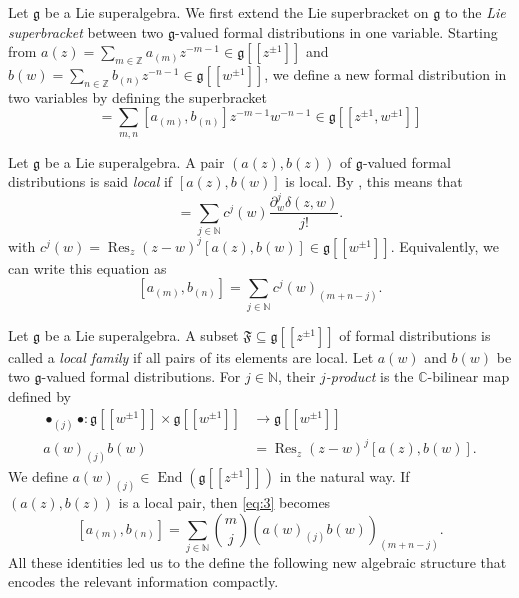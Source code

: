 \documentclass[a4paper, 12pt, reqno]{amsart}
\theoremstyle{remark}
\numberwithin{equation}{subsection}
\DeclareMathOperator{\End}{End}
\DeclareMathOperator{\Res}{Res}
\begin{document}
Let $\mathfrak{g}$ be a Lie superalgebra.
We first extend the Lie superbracket on $\mathfrak{g}$ to the \emph{Lie superbracket} between two $\mathfrak{g}$-valued formal distributions in one variable. Starting from $a(z) = \sum_{m \in \mathbb{Z}}a_{(m)}z^{-m - 1} \in \mathfrak{g}[[z^{\pm 1}]]$ and $b(w) = \sum_{n \in \mathbb{Z}}b_{(n)}z^{-n - 1} \in \mathfrak{g}[[w^{\pm 1}]]$, we define a new formal distribution in two variables by defining the superbracket
\begin{equation*}
  [a(z), b(w)] = \sum_{m, n}[a_{(m)}, b_{(n)}]z^{-m - 1}w^{-n - 1} \in \mathfrak{g}[[z^{\pm 1}, w^{\pm 1}]]
\end{equation*}

Let $\mathfrak{g}$ be a Lie superalgebra.
A pair $(a(z), b(z))$ of $\mathfrak{g}$-valued formal distributions is said \emph{local} if $[a(z), b(w)]$ is local.
By , this means that
\begin{equation*}
  [a(z), b(w)] = \sum_{j \in \mathbb{N}}c^j(w)\frac{\partial^j_w\delta(z, w)}{j!}.
\end{equation*}
with $c^j(w) = \Res_z(z - w)^j[a(z), b(w)] \in \mathfrak{g}[[w^{\pm 1}]]$.
Equivalently, we can write this equation as
\begin{equation}
  \label{eq:3}
  [a_{(m)}, b_{(n)}] = \sum_{j \in \mathbb{N}}c^j(w)_{(m + n - j)}.
\end{equation}

Let $\mathfrak{g}$ be a Lie superalgebra.
A subset $\mathfrak{F} \subseteq \mathfrak{g}[[z^{\pm 1}]]$ of formal distributions is called a \emph{local family} if all pairs of its elements are local.
Let $a(w)$ and $b(w)$ be two $\mathfrak{g}$-valued formal distributions.
For $j \in \mathbb{N}$, their \emph{$j$-product} is the $\mathbb{C}$-bilinear map defined by
\begin{align*}
  \bullet_{(j)}\bullet: \mathfrak{g}[[w^{\pm 1}]]\times\mathfrak{g}[[w^{\pm 1}]] &\to \mathfrak{g}[[w^{\pm 1}]]\\
  a(w)_{(j)}b(w) &= \Res_z(z - w)^j[a(z), b(w)].
\end{align*}
We define $a(w)_{(j)} \in \End(\mathfrak{g}[[z^{\pm 1}]])$ in the natural way.
If $(a(z), b(z))$ is a local pair, then \eqref{eq:3} becomes
\begin{equation}
  \label{eq:4}
  [a_{(m)}, b_{(n)}] = \sum_{j \in \mathbb{N}}\binom{m}{j}(a(w)_{(j)}b(w))_{(m + n - j)}.
\end{equation}
All these identities led us to the define the following new algebraic structure that encodes the relevant information compactly.
\end{document}
